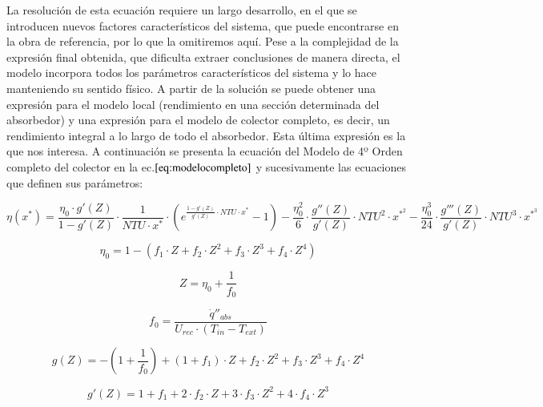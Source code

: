 La resolución de esta ecuación requiere un largo desarrollo, en el que se introducen nuevos factores característicos del sistema, que puede encontrarse en la obra de referencia, por lo que la omitiremos aquí. Pese a la complejidad de la expresión final obtenida, que dificulta extraer conclusiones de manera directa, el modelo incorpora todos los parámetros característicos del sistema y lo hace manteniendo su sentido físico. A partir de la solución se puede obtener una expresión para el modelo local (rendimiento en una sección determinada del absorbedor) y una expresión para el modelo de colector completo, es decir, un rendimiento integral a lo largo de todo el absorbedor. Esta última expresión es la que nos interesa. A continuación se presenta la ecuación del Modelo de 4º Orden completo del colector en la ec.\(\eqref{eq:modelocompleto}\) y sucesivamente las ecuaciones que definen sus parámetros:

\begin{equation}
    \eta(x^{*}) = \frac{\eta_{0} \cdot g'(Z)}{1-g'(Z)} \cdot \frac{1}{NTU \cdot x^{*}} \cdot \left(e^{\frac{1-g'(Z)}{g'(Z)}\cdot NTU \cdot x^{*}} - 1\right) - \frac{\eta_{0}^2}{6} \cdot \frac{g''(Z)}{g'(Z)} \cdot NTU^{2} \cdot x^{*^{2}} - \frac{\eta_{0}^{3}}{24} \cdot \frac{g'''(Z)}{g'(Z)} \cdot NTU^{3} \cdot x^{*^{3}}
    \label{eq:modelocompleto}
\end{equation}

\begin{equation}
    \eta_{0} = 1 - (f_{1} \cdot Z + f_{2} \cdot Z^{2} + f_{3} \cdot Z^{3} + f_{4} \cdot Z^{4})
    \label{eq:rendimiento0}
\end{equation}

\begin{equation}
    Z = \eta_{0} + \frac{1}{f_{0}} 
    \label{eq:zeta}
\end{equation}

\begin{equation}
    f_0 = \frac{\dot{q}''_{abs}}{U_{rec} \cdot (T_{in}-T_{ext})}
    \label{eq:f0}
\end{equation}

\begin{equation}
    g(Z) = -\left(1+\frac{1}{f_{0}}\right)+(1+f_{1})\cdot Z + f_{2}\cdot Z^{2} +  f_{3}\cdot Z^{3} + f_{4}\cdot Z^{4} 
    \label{eq:gdezeta}
\end{equation}

\begin{equation}
    g'(Z) = 1 + f_{1} + 2 \cdot f_{2} \cdot Z + 3 \cdot f_{3} \cdot Z^{2} + 4 \cdot f_{4} \cdot Z^{3} 
    \label{eq:gprimadezeta}
\end{equation}

